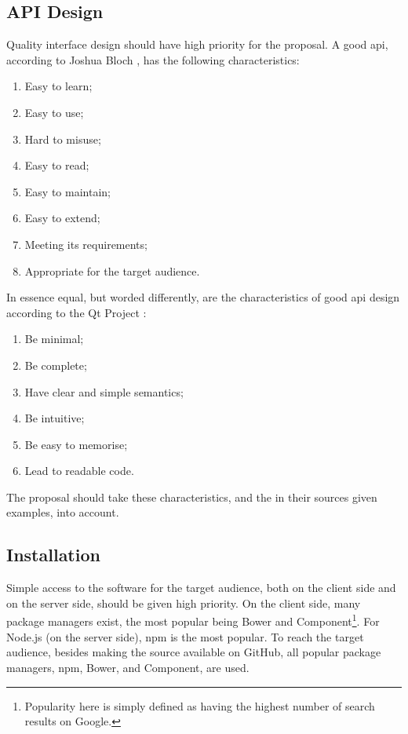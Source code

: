 \subsection{API Design}\label{design-1}

Quality interface design should have high priority for the proposal.
A good \gls{api}, according to Joshua Bloch
  \autocite*{bloch-joshua-how-design-good-api-why-matters}, has the following
  characteristics:

\begin{enumerate}
\item Easy to learn;
\item Easy to use;
\item Hard to misuse;
\item Easy to read;
\item Easy to maintain;
\item Easy to extend;
\item Meeting its requirements;
\item Appropriate for the target audience.
\end{enumerate}

\noindent In essence equal, but worded differently, are the characteristics
  of good \gls{api} design according to the Qt Project
  \autocite*{qt-project.org-api-design-principles}:

\begin{enumerate}
\item Be minimal;
\item Be complete;
\item Have clear and simple semantics;
\item Be intuitive;
\item Be easy to memorise;
\item Lead to readable code.
\end{enumerate}

\noindent The proposal should take these characteristics, and the in their
  sources given examples, into account.

\subsection{Installation}\label{installation}

Simple access to the software for the target audience, both on the client
  side and on the server side, should be given high priority.
On the client side, many package managers exist, the most
  popular being Bower and Component\footnote{Popularity here is simply
    defined as having the highest number of search results on Google.}.
For Node.js (on the server side), \gls{npm} is the most popular.
To reach the target audience, besides making the source available on GitHub,
  all popular package managers, \gls{npm}, Bower, and Component, are used.

